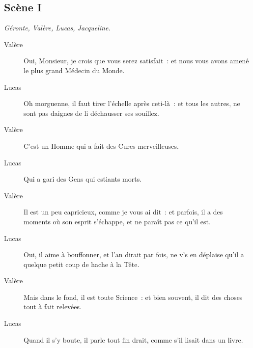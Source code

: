 \documentclass[french,twoside]{book} %
\begin{document}
\subsection[{Scène I}]{Scène I}
\label{II01}
\textit{Géronte, Valère, Lucas, Jacqueline.}\par
 \begin{description} \item[Valère] 

Oui, Monsieur, je crois que vous serez satisfait : et nous vous avons amené le plus grand Médecin du Monde.\end{description}
 \begin{description} \item[Lucas] 

Oh morguenne, il faut tirer l’échelle après ceti-là : et tous les autres, ne sont pas daignes de li déchausser ses souillez.\end{description}
 \begin{description} \item[Valère] 

C’est un Homme qui a fait des Cures merveilleuses.\end{description}
 \begin{description} \item[Lucas] 

Qui a gari des Gens qui estiants morts.\end{description}
 \begin{description} \item[Valère] 

Il est un peu capricieux, comme je vous ai dit : et parfois, il a des moments où son esprit s’échappe, et ne paraît pas ce qu’il est.\end{description}
 \begin{description} \item[Lucas] 

Oui, il aime à bouffonner, et l’an dirait par fois, ne v’s en déplaise qu’il a quelque petit coup de hache à la Tête.\end{description}
 \begin{description} \item[Valère] 

Mais dans le fond, il est toute Science : et bien souvent, il dit des choses tout à fait relevées.\end{description}
 \begin{description} \item[Lucas] 

Quand il s’y boute, il parle tout fin drait, comme s’il lisait dans un livre.\end{description}
\end{document}
